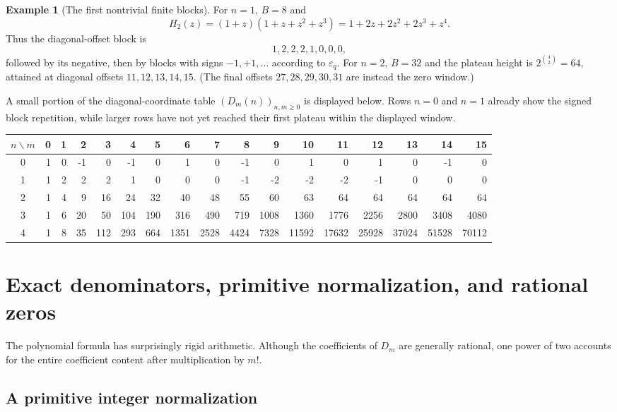 \documentclass[11pt,oneside]{article}
\theoremstyle{definition}
\newtheorem{example}[theorem]{Example}
\theoremstyle{remark}
\newcommand{\eps}{\varepsilon}
\newcommand{\Diag}{D}
\begin{document}
\begin{example}[The first nontrivial finite blocks]
For $n=1$, $B=8$ and
\[
 H_2(z)=(1+z)(1+z+z^2+z^3)
       =1+2z+2z^2+2z^3+z^4.
\]
Thus the diagonal-offset block is
\[
 1,2,2,2,1,0,0,0,
\]
followed by its negative, then by blocks with signs $-1,+1,\ldots$ according
to $\eps_q$.  For $n=2$, $B=32$ and the plateau height is
$2^{\binom42}=64$, attained at diagonal offsets $11,12,13,14,15$.
(The final offsets $27,28,29,30,31$ are instead the zero window.)
\end{example}

A small portion of the diagonal-coordinate table
$(\Diag_m(n))_{n,m\ge0}$ is displayed below.  Rows $n=0$ and $n=1$ already
show the signed block repetition, while larger rows have not yet reached
their first plateau within the displayed window.

\begin{center}
\scriptsize
\setlength{\tabcolsep}{3.6pt}
\begin{tabular}{c|rrrrrrrrrrrrrrrr}
\toprule
$n\backslash m$&0&1&2&3&4&5&6&7&8&9&10&11&12&13&14&15\\
\midrule
0&1&0&-1&0&-1&0&1&0&-1&0&1&0&1&0&-1&0\\
1&1&2&2&2&1&0&0&0&-1&-2&-2&-2&-1&0&0&0\\
2&1&4&9&16&24&32&40&48&55&60&63&64&64&64&64&64\\
3&1&6&20&50&104&190&316&490&719&1008&1360&1776&2256&2800&3408&4080\\
4&1&8&35&112&293&664&1351&2528&4424&7328&11592&17632&25928&37024&51528&70112\\
\bottomrule
\end{tabular}
\end{center}

\section{Exact denominators, primitive normalization, and rational zeros}
\label{sec:arithmetic}

The polynomial formula has surprisingly rigid arithmetic.  Although the
coefficients of $\Diag_m$ are generally rational, one power of two accounts
for the entire coefficient content after multiplication by $m!$.

\subsection{A primitive integer normalization}
\end{document}
